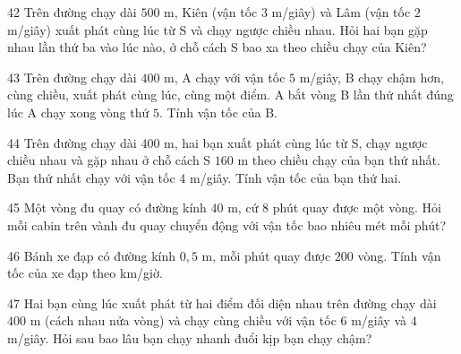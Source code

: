 \gap
\begin{probbox}{42}{}
Trên đường chạy dài $500$ m, Kiên (vận tốc $3$ m/giây) và Lâm (vận tốc $2$ m/giây) xuất phát cùng lúc từ S và chạy ngược chiều nhau. Hỏi hai bạn gặp nhau lần thứ ba vào lúc nào, ở chỗ cách S bao xa theo chiều chạy của Kiên?
\end{probbox}
\gap
\begin{probbox}{43}{}
Trên đường chạy dài $400$ m, A chạy với vận tốc $5$ m/giây, B chạy chậm hơn, cùng chiều, xuất phát cùng lúc, cùng một điểm. A bắt vòng B lần thứ nhất đúng lúc A chạy xong vòng thứ $5$. Tính vận tốc của B.
\end{probbox}
\gap
\begin{probbox}{44}{}
Trên đường chạy dài $400$ m, hai bạn xuất phát cùng lúc từ S, chạy ngược chiều nhau và gặp nhau ở chỗ cách S $160$ m theo chiều chạy của bạn thứ nhất. Bạn thứ nhất chạy với vận tốc $4$ m/giây. Tính vận tốc của bạn thứ hai.
\end{probbox}
\gap
\begin{probbox}{45}{}
Một vòng đu quay có đường kính $40$ m, cứ $8$ phút quay được một vòng. Hỏi mỗi cabin trên vành đu quay chuyển động với vận tốc bao nhiêu mét mỗi phút?
\end{probbox}
\gap
\begin{probbox}{46}{}
Bánh xe đạp có đường kính $0{,}5$ m, mỗi phút quay được $200$ vòng. Tính vận tốc của xe đạp theo km/giờ.
\end{probbox}
\gap
\begin{probbox}{47}{}
Hai bạn cùng lúc xuất phát từ hai điểm đối diện nhau trên đường chạy dài $400$ m (cách nhau nửa vòng) và chạy cùng chiều với vận tốc $6$ m/giây và $4$ m/giây. Hỏi sau bao lâu bạn chạy nhanh đuổi kịp bạn chạy chậm?
\end{probbox}
